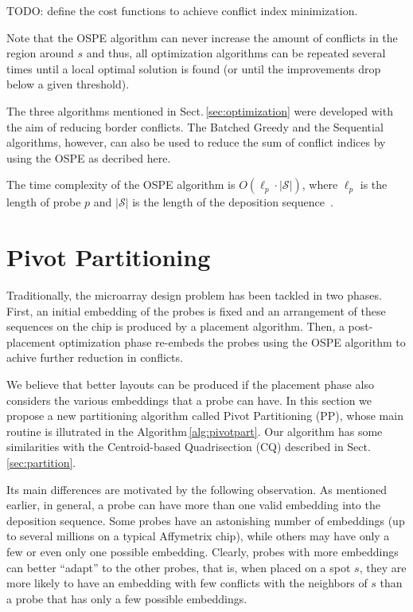 \documentclass{llncs}
\begin{document}
TODO: define the cost functions to achieve conflict index minimization.

Note that the OSPE algorithm can never increase the amount of conflicts in the region
around $s$ and thus, all optimization algorithms can be repeated several times until
a local optimal solution is found (or until the improvements drop below a given threshold).

The three algorithms mentioned in Sect.\,\ref{sec:optimization} were developed with
the aim of reducing border conflicts. The Batched Greedy and the Sequential algorithms,
however, can also be used to reduce the sum of conflict indices by using the OSPE as
decribed here.

The time complexity of the OSPE algorithm is $O(\ell_p \cdot |\mathcal{S}|)$,
where $\ell_p$ is the length of probe $p$ and $|\mathcal{S}|$ is the length of
the deposition sequence~\cite{KAHNG02}.

\section{Pivot Partitioning}
\label{sec:pivotpart}

Traditionally, the microarray design problem has been tackled in two phases. First,
an initial embedding of the probes is fixed and an arrangement of these sequences
on the chip is produced by a placement algorithm. Then, a post-placement optimization
phase re-embeds the probes using the OSPE algorithm to achive further reduction in
conflicts.

We believe that better layouts can be produced if the placement phase also considers
the various embeddings that a probe can have. In this section we propose a new
partitioning algorithm called Pivot Partitioning (PP), whose main routine is
illutrated in the Algorithm\,\ref{alg:pivotpart}. Our algorithm
has some similarities with the Centroid-based Quadrisection (CQ) described
in Sect.\,\ref{sec:partition}.

Its main differences are motivated by the following observation.
As mentioned earlier, in general, a probe can have more than one valid embedding
into the deposition sequence. Some probes have an
astonishing number of embeddings (up to several millions on a typical
Affymetrix chip), while others may have only a few or even only one possible embedding.
Clearly, probes with more embeddings can better
``adapt'' to the other probes, that is, when placed on a spot $s$, they are more likely
to have an embedding with few conflicts with the neighbors of $s$ than a probe that has
only a few possible embeddings.
\end{document}
